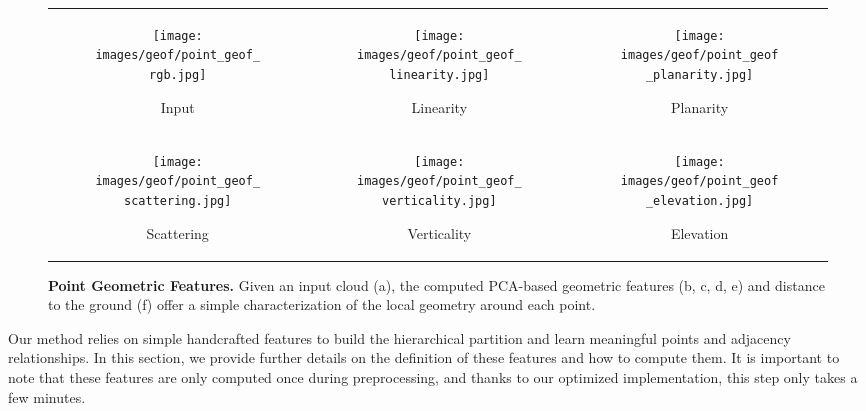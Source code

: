 \begin{figure*}[ht!]
\centering
\begin{tabular}{@{}ccc@{}}

\begin{subfigure}[b]{0.3\textwidth}
  \texttt{[image: images/geof/point\_geof\_rgb.jpg]}
  \caption{Input}
  \label{fig:geof:rgb}
\end{subfigure}
&
\begin{subfigure}[b]{0.3\textwidth}
  \texttt{[image: images/geof/point\_geof\_linearity.jpg]}
  \caption{Linearity}
  \label{fig:geof:linearity}
\end{subfigure}
 & 
\begin{subfigure}[b]{0.3\textwidth}
  \texttt{[image: images/geof/point\_geof\_planarity.jpg]}
  \caption{Planarity}
  \label{fig:geof:planarity}
\end{subfigure}
\\

\begin{subfigure}[b]{0.3\textwidth}
  \texttt{[image: images/geof/point\_geof\_scattering.jpg]}
  \caption{Scattering}
  \label{fig:geof:scattering}
\end{subfigure}
&
\begin{subfigure}[b]{0.3\textwidth}
  \texttt{[image: images/geof/point\_geof\_verticality.jpg]}
  \caption{Verticality}
  \label{fig:geof:verticality}
\end{subfigure}
&
\begin{subfigure}[b]{0.3\textwidth}
  \texttt{[image: images/geof/point\_geof\_elevation.jpg]}
  \caption{Elevation}
  \label{fig:geof:elevation}
\end{subfigure}
\\

\end{tabular}

\caption{{\bf Point Geometric Features.} Given an input cloud (a), the computed PCA-based geometric features (b, c, d, e) and distance to the ground (f) offer a simple characterization of the local geometry around each point.}

\label{fig:geof}
\end{figure*} 
Our method relies on simple handcrafted features to build the hierarchical partition and learn meaningful {points and adjacency relationships.}
In this section, we provide further details on the definition of these features and how to compute them.
It is important to note that these features are only computed once during preprocessing, and thanks to our optimized implementation, this step only takes a few minutes.



